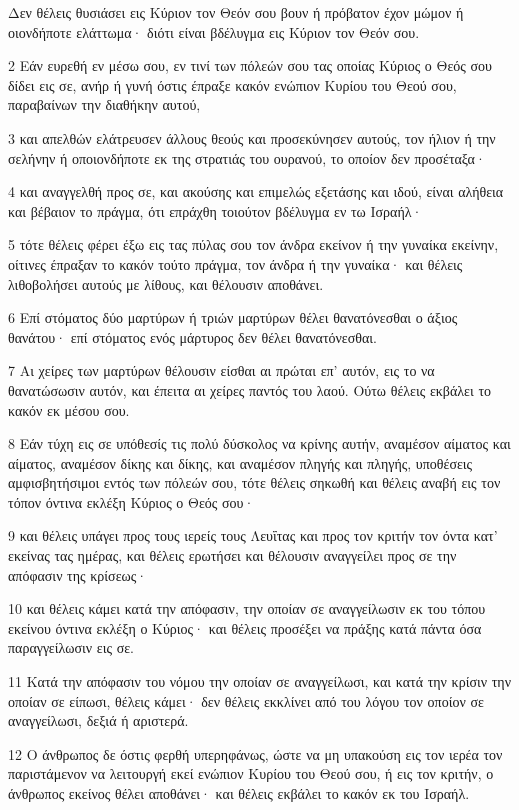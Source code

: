 \par Δεν θέλεις θυσιάσει εις Κύριον τον Θεόν σου βουν ή πρόβατον έχον μώμον ή οιονδήποτε ελάττωμα· διότι είναι βδέλυγμα εις Κύριον τον Θεόν σου.
\par 2 Εάν ευρεθή εν μέσω σου, εν τινί των πόλεών σου τας οποίας Κύριος ο Θεός σου δίδει εις σε, ανήρ ή γυνή όστις έπραξε κακόν ενώπιον Κυρίου του Θεού σου, παραβαίνων την διαθήκην αυτού,
\par 3 και απελθών ελάτρευσεν άλλους θεούς και προσεκύνησεν αυτούς, τον ήλιον ή την σελήνην ή οποιονδήποτε εκ της στρατιάς του ουρανού, το οποίον δεν προσέταξα·
\par 4 και αναγγελθή προς σε, και ακούσης και επιμελώς εξετάσης και ιδού, είναι αλήθεια και βέβαιον το πράγμα, ότι επράχθη τοιούτον βδέλυγμα εν τω Ισραήλ·
\par 5 τότε θέλεις φέρει έξω εις τας πύλας σου τον άνδρα εκείνον ή την γυναίκα εκείνην, οίτινες έπραξαν το κακόν τούτο πράγμα, τον άνδρα ή την γυναίκα· και θέλεις λιθοβολήσει αυτούς με λίθους, και θέλουσιν αποθάνει.
\par 6 Επί στόματος δύο μαρτύρων ή τριών μαρτύρων θέλει θανατόνεσθαι ο άξιος θανάτου· επί στόματος ενός μάρτυρος δεν θέλει θανατόνεσθαι.
\par 7 Αι χείρες των μαρτύρων θέλουσιν είσθαι αι πρώται επ' αυτόν, εις το να θανατώσωσιν αυτόν, και έπειτα αι χείρες παντός του λαού. Ούτω θέλεις εκβάλει το κακόν εκ μέσου σου.
\par 8 Εάν τύχη εις σε υπόθεσίς τις πολύ δύσκολος να κρίνης αυτήν, αναμέσον αίματος και αίματος, αναμέσον δίκης και δίκης, και αναμέσον πληγής και πληγής, υποθέσεις αμφισβητήσιμοι εντός των πόλεών σου, τότε θέλεις σηκωθή και θέλεις αναβή εις τον τόπον όντινα εκλέξη Κύριος ο Θεός σου·
\par 9 και θέλεις υπάγει προς τους ιερείς τους Λευΐτας και προς τον κριτήν τον όντα κατ' εκείνας τας ημέρας, και θέλεις ερωτήσει και θέλουσιν αναγγείλει προς σε την απόφασιν της κρίσεως·
\par 10 και θέλεις κάμει κατά την απόφασιν, την οποίαν σε αναγγείλωσιν εκ του τόπου εκείνου όντινα εκλέξη ο Κύριος· και θέλεις προσέξει να πράξης κατά πάντα όσα παραγγείλωσιν εις σε.
\par 11 Κατά την απόφασιν του νόμου την οποίαν σε αναγγείλωσι, και κατά την κρίσιν την οποίαν σε είπωσι, θέλεις κάμει· δεν θέλεις εκκλίνει από του λόγου τον οποίον σε αναγγείλωσι, δεξιά ή αριστερά.
\par 12 Ο άνθρωπος δε όστις φερθή υπερηφάνως, ώστε να μη υπακούση εις τον ιερέα τον παριστάμενον να λειτουργή εκεί ενώπιον Κυρίου του Θεού σου, ή εις τον κριτήν, ο άνθρωπος εκείνος θέλει αποθάνει· και θέλεις εκβάλει το κακόν εκ του Ισραήλ.

